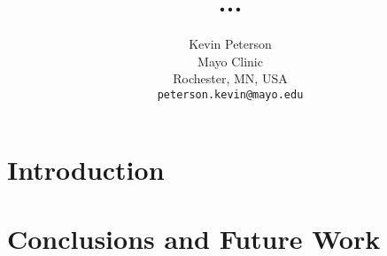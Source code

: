 \documentclass[12pt]{proc}
\title{...}
\author{Kevin Peterson\\
\small Mayo Clinic\\
\small Rochester, MN, USA\\
\small \texttt{peterson.kevin@mayo.edu}\\
}
\begin{document}
\maketitle

\begin{abstract}

\end{abstract}

\section{Introduction}

\section{Conclusions and Future Work}
\end{document}
